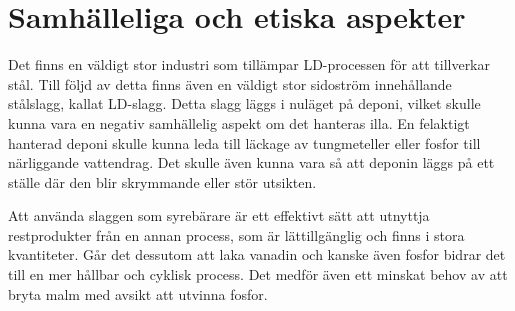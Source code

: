 \section{Samhälleliga och etiska aspekter}
Det finns en  väldigt stor industri som tillämpar LD-processen för att tillverkar stål. Till följd av detta finns även en väldigt stor sidoström innehållande stålslagg, kallat LD-slagg. Detta slagg läggs i nuläget på deponi, vilket skulle kunna vara en negativ samhällelig aspekt om det hanteras illa. En felaktigt hanterad deponi skulle kunna leda till läckage av tungmeteller eller fosfor till närliggande vattendrag. Det skulle även kunna vara så att deponin läggs på ett ställe där den blir skrymmande eller stör utsikten. 


Att använda slaggen som syrebärare är ett effektivt sätt att utnyttja restprodukter från en annan process, som är lättillgänglig och finns i stora kvantiteter. Går det dessutom att laka vanadin och kanske även fosfor bidrar det till en mer hållbar och cyklisk process. Det medför även ett minskat behov av att bryta malm med avsikt att utvinna fosfor. 






